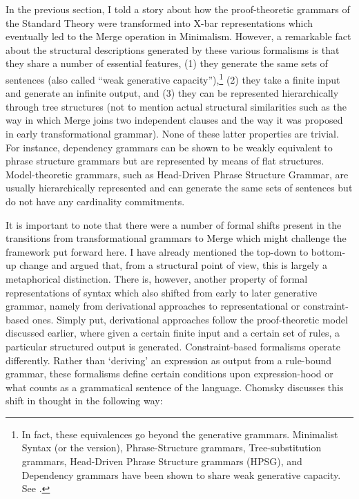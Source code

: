 \documentclass[output=paper]{langscibook}
\begin{document}
In the previous section, I told a story about how the proof-theoretic grammars of the Standard Theory were transformed into X-bar representations which eventually led to the Merge operation in Minimalism. However, a remarkable fact about the structural descriptions generated by these various formalisms is that they share a number of essential features, (1) they generate the same sets of sentences (also called ``weak generative capacity''),\footnote{In fact, these equivalences go beyond the generative grammars.  Minimalist Syntax (or the \citealt{Stabler1997} version), Phrase-Structure grammars, Tree-substitution grammars, Head-Driven Phrase Structure grammars (HPSG), and Dependency grammars have been shown to share weak generative capacity. See \cite{Monnich2007}.} (2) they take a finite input and generate an infinite output, and (3) they can be represented hierarchically through tree structures (not to mention actual structural similarities such as the way in which Merge joins two independent clauses and the way it was proposed in early transformational grammar). None of these latter properties are trivial. For instance, dependency grammars can be shown to be weakly equivalent to phrase structure grammars but are represented by means of flat structures. Model-theoretic grammars, such as Head-Driven Phrase Structure Grammar, are usually hierarchically represented and can generate the same sets of sentences but do not have any cardinality commitments. 

It is important to note that there were a number of formal shifts present in the transitions from transformational grammars to Merge which might challenge the framework put forward here. I have already mentioned the top-down to bottom-up change and argued that, from a structural point of view, this is largely a metaphorical distinction. There is, however, another property of formal representations of syntax which also shifted from early to later generative grammar, namely from derivational approaches to representational or constraint-based ones. Simply put, derivational approaches follow the proof-theoretic model discussed earlier, where given a certain finite input and a certain set of rules, a particular structured output is generated. Constraint-based formalisms operate differently. Rather than \textquoteleft deriving' an expression as output from a rule-bound grammar, these formalisms define certain conditions upon expression-hood or what counts as a grammatical sentence of the language. 
Chomsky discusses this shift in thought in the following way:
\end{document}

